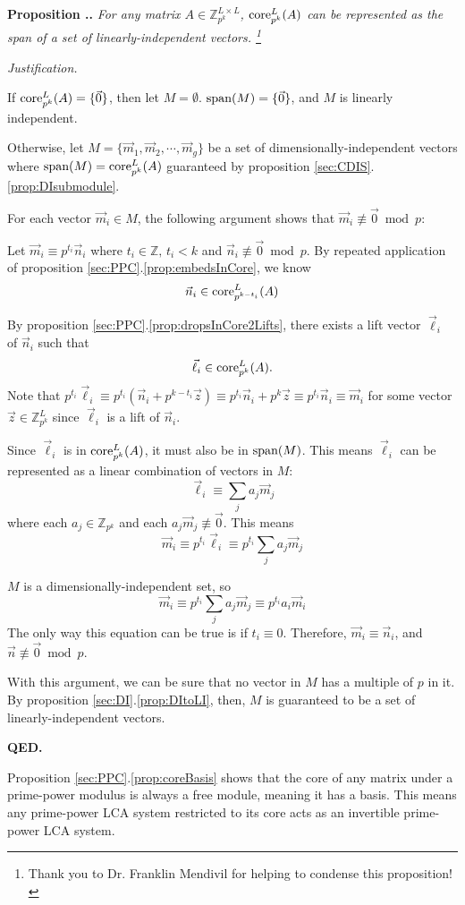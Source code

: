 \documentclass[a4paper, 12pt, reqno]{amsart}
\newcommand\vecspan[1]{\textup{span}(#1)}
\newcommand\core[3]{\textup{core}_{#1}^{#2}(#3)}
\newcounter{propcounter}[section]
\newenvironment{proposition}[1]
{
	\refstepcounter{propcounter}
	\textbf{Proposition \thesection.\thepropcounter.} \emph{#1}
	
	\emph{Justification.}
}
{
	\textbf{QED.} \\
}
\begin{document}
		\begin{proposition}{For any matrix $A \in \mathds{Z}_{p^k}^{L \times L}$, $\core{p^k}{L}{A}$ can be represented as the span of a set of linearly-independent vectors.
		\footnote{Thank you to Dr. Franklin Mendivil for helping to condense this proposition!}}
			\label{prop:coreBasis}
			If $\core{p^k}{L}{A} = \{\vec{0}\}$, then let $M = \emptyset$. $\vecspan{M} = \{\vec{0}\}$, and $M$ is linearly independent.
			
			Otherwise, let $M = \{\vec{m}_1, \vec{m}_2, \cdots, \vec{m}_g\}$ be a set of dimensionally-independent vectors where $\vecspan{M} = \core{p^k}{L}{A}$ guaranteed 
			by proposition \ref{sec:CDIS}.\ref{prop:DIsubmodule}.
			
			For each vector $\vec{m}_i \in M$, the following argument shows that $\vec{m}_i \not\equiv \vec{0} \bmod{p}$: 
			
			Let $\vec{m}_i \equiv p^{t_i}\vec{n}_i$ where $t_i \in \mathds{Z},\, t_i < k$ and $\vec{n}_i \not\equiv \vec{0} \bmod{p}$. By repeated application of proposition
			\ref{sec:PPC}.\ref{prop:embedsInCore}, we know
			\[
				\vec{n}_i \in \core{p^{k-t_i}}{L}{A}
			\]
			
			By proposition \ref{sec:PPC}.\ref{prop:dropsInCore2Lifts}, there exists a lift vector $\vec{\ell}_i$ of $\vec{n}_i$ such that 
			\[
				\vec{\ell}_i \in \core{p^k}{L}{A}. 
			\]
			Note that $p^{t_i}\vec{\ell}_i \equiv p^{t_i}(\vec{n}_i + p^{k-t_i}\vec{z}) \equiv p^{t_i}\vec{n}_i + p^k\vec{z} \equiv p^{t_i}\vec{n}_i \equiv \vec{m}_i$ for
			some vector $\vec{z} \in \mathds{Z}_{p^k}^L$ since $\vec{\ell}_i$ is a lift of $\vec{n}_i$.
			
			Since $\vec{\ell}_i$ is in $\core{p^k}{L}{A}$, it must also be in $\vecspan{M}$. This means $\vec{\ell}_i$ can be represented as a linear combination of vectors
			in $M$:
			\[
				\vec{\ell}_i \equiv \sum_j a_j\vec{m}_j
			\]
			where each $a_j \in \mathds{Z}_{p^k}$ and each $a_j\vec{m}_j \not\equiv \vec{0}$. This means
			\[
				\vec{m}_i \equiv p^{t_i}\vec{\ell}_i \equiv p^{t_i}\sum_j a_j\vec{m}_j
			\]
			
			$M$ is a dimensionally-independent set, so 
			\[
				\vec{m}_i \equiv p^{t_i} \sum_j a_j\vec{m}_j \equiv p^{t_i}a_i\vec{m}_i
			\]
			The only way this equation can be true is if $t_i \equiv 0$. Therefore, $\vec{m}_i \equiv \vec{n}_i$, and $\vec{n} \not\equiv \vec{0} \bmod{p}$.
			
			With this argument, we can be sure that no vector in $M$ has a multiple of $p$ in it. By proposition \ref{sec:DI}.\ref{prop:DItoLI}, then, $M$ is guaranteed 
			to be a set of linearly-independent vectors.
		\end{proposition}
		
		Proposition \ref{sec:PPC}.\ref{prop:coreBasis} shows that the core of any matrix under a prime-power modulus is always a free module, meaning it has a basis. This
		means any prime-power LCA system restricted to its core acts as an invertible prime-power LCA system.
\end{document}
